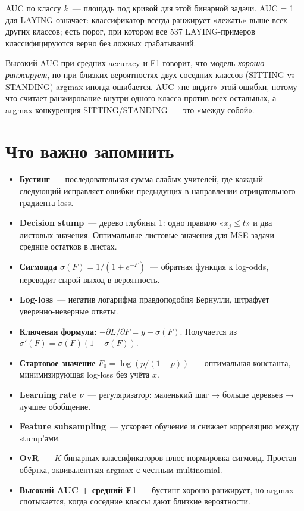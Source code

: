 \documentclass[12pt,a4paper]{article}
\begin{document}
AUC по классу $k$~--- площадь под кривой для этой бинарной задачи. AUC = 1 для LAYING означает: классификатор всегда ранжирует «лежать» выше всех других классов; есть порог, при котором все 537 LAYING-примеров классифицируются верно без ложных срабатываний.

\begin{intuition}
Высокий AUC при средних accuracy и F1 говорит, что модель \emph{хорошо ранжирует}, но при близких вероятностях двух соседних классов (SITTING vs STANDING) argmax иногда ошибается. AUC «не видит» этой ошибки, потому что считает ранжирование внутри одного класса против всех остальных, а argmax-конкуренция SITTING/STANDING~--- это «между собой».
\end{intuition}

\section{Что важно запомнить}

\begin{itemize}
  \item \textbf{Бустинг}~--- последовательная сумма слабых учителей, где каждый следующий исправляет ошибки предыдущих в направлении отрицательного градиента loss.
  \item \textbf{Decision stump}~--- дерево глубины 1: одно правило «$x_j \le t$» и два листовых значения. Оптимальные листовые значения для MSE-задачи~--- средние остатков в листах.
  \item \textbf{Сигмоида $\sigma(F) = 1/(1+e^{-F})$}~--- обратная функция к log-odds, переводит сырой выход в вероятность.
  \item \textbf{Log-loss}~--- негатив логарифма правдоподобия Бернулли, штрафует уверенно-неверные ответы.
  \item \textbf{Ключевая формула:} $-\partial L/\partial F = y - \sigma(F)$. Получается из $\sigma'(F) = \sigma(F)(1 - \sigma(F))$.
  \item \textbf{Стартовое значение} $F_0 = \log(p/(1-p))$~--- оптимальная константа, минимизирующая log-loss без учёта $x$.
  \item \textbf{Learning rate $\nu$}~--- регуляризатор: маленький шаг → больше деревьев → лучшее обобщение.
  \item \textbf{Feature subsampling}~--- ускоряет обучение и снижает корреляцию между stump'ами.
  \item \textbf{OvR}~--- $K$ бинарных классификаторов плюс нормировка сигмоид. Простая обёртка, эквивалентная argmax с честным multinomial.
  \item \textbf{Высокий AUC + средний F1}~--- бустинг хорошо ранжирует, но argmax спотыкается, когда соседние классы дают близкие вероятности.
\end{itemize}
\end{document}
